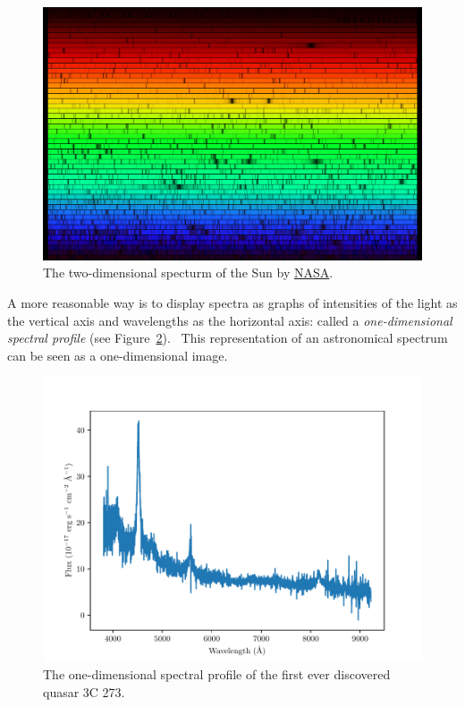 \begin{figure}
\includegraphics[width=\textwidth]{img/solarspectrum.jpg}
\caption[Two-dimensional Solar spectrum]{
	The two-dimensional specturm of the Sun by \href{https://solarsystem.nasa.gov/resources/390/the-solar-spectrum/}{NASA}.
}
\label{solar_spectrum}
\end{figure}

A more reasonable way is to display spectra as graphs of intensities of the light as the vertical axis and wavelengths as the horizontal axis:
called a \textit{one-dimensional spectral profile}
(see Figure~\ref{3c_273_spectrum}).~\cite{cochard2018, bennett2005}
This representation of an astronomical spectrum can be seen as a one-dimensional image.

\begin{figure}
\includegraphics[width=\textwidth]{img/spec_3c_273.pdf}
\caption[One-dimensional spectum of the quasar 3C 273]{
	The one-dimensional spectral profile of the first ever discovered quasar 3C 273.
}
\label{3c_273_spectrum}
\end{figure}


